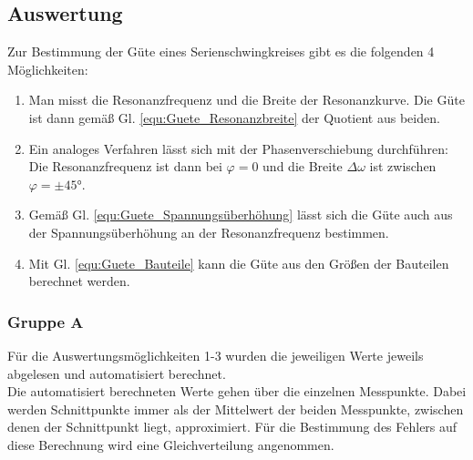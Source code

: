 \documentclass[12pt,a4paper]{article}
\begin{document}
\subsection{Auswertung}
Zur Bestimmung der Güte eines Serienschwingkreises gibt es die folgenden 4 Möglichkeiten:
\begin{enumerate}
\item Man misst die Resonanzfrequenz und die Breite der Resonanzkurve. Die Güte ist dann gemäß Gl. \ref{equ:Guete_Resonanzbreite} der Quotient aus beiden.
\item Ein analoges Verfahren lässt sich mit der Phasenverschiebung durchführen: Die Resonanzfrequenz ist dann bei $\varphi = 0$ und die Breite $\Delta \omega$ ist zwischen $\varphi = \pm \ang{45}$.
\item Gemäß Gl. \ref{equ:Guete_Spannungsüberhöhung} lässt sich die Güte auch aus der Spannungsüberhöhung an der Resonanzfrequenz bestimmen.
\item Mit Gl. \ref{equ:Guete_Bauteile} kann die Güte aus den Größen der Bauteilen berechnet werden.
\end{enumerate}

\subsubsection{Gruppe A}
Für die Auswertungsmöglichkeiten 1-3 wurden die jeweiligen Werte jeweils abgelesen und automatisiert berechnet.\\
Die automatisiert berechneten Werte gehen über die einzelnen Messpunkte. Dabei werden Schnittpunkte immer als der Mittelwert der beiden Messpunkte, zwischen denen der Schnittpunkt liegt, approximiert. Für die Bestimmung des Fehlers auf diese Berechnung wird eine Gleichverteilung angenommen.\\
\end{document}
